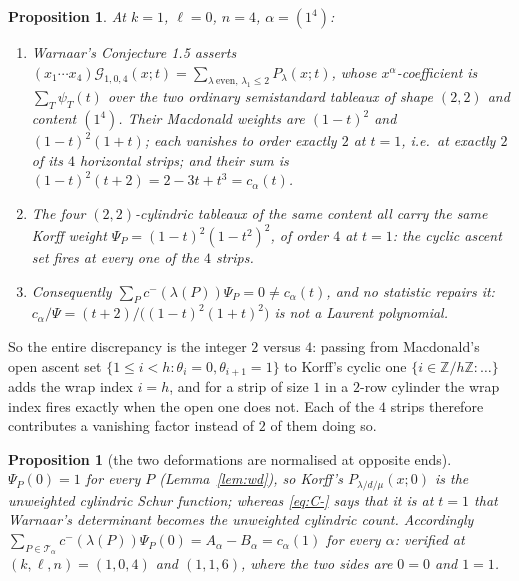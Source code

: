 \documentclass[11pt]{article}
\newtheorem{proposition}[theorem]{Proposition}
\theoremstyle{definition}
\newcommand{\la}{\lambda}
\newcommand{\Z}{\mathbb{Z}}
\newcommand{\T}{\mathcal{T}}
\begin{document}
\begin{proposition}\label{prop:located}
At $k=1$, $\ell=0$, $n=4$, $\alpha=(1^4)$:
\begin{enumerate}
\item Warnaar's Conjecture 1.5 asserts
$(x_1\cdots x_4)\mathcal G_{1,0,4}(x;t)=\sum_{\la\ \mathrm{even},\,\la_1\le2}P_\la(x;t)$,
whose $x^{\alpha}$-coefficient is $\sum_{T}\psi_T(t)$ over the two ordinary
semistandard tableaux of shape $(2,2)$ and content $(1^4)$. Their Macdonald
weights are $(1-t)^{2}$ and $(1-t)^{2}(1+t)$; each vanishes to order exactly
$2$ at $t=1$, i.e.\ at exactly $2$ of its $4$ horizontal strips; and their sum
is $(1-t)^{2}(t+2)=2-3t+t^{3}=c_\alpha(t)$.
\item The four $(2,2)$-cylindric tableaux of the same content all carry the
\emph{same} Korff weight $\Psi_P=(1-t)^{2}(1-t^{2})^{2}$, of order $4$ at
$t=1$: the cyclic ascent set fires at \emph{every} one of the $4$ strips.
\item Consequently $\sum_P c^{-}(\la(P))\Psi_P=0\ne c_\alpha(t)$, and no
statistic repairs it: $c_\alpha/\Psi=(t+2)/\bigl((1-t)^{2}(1+t)^{2}\bigr)$ is
not a Laurent polynomial.
\end{enumerate}
\end{proposition}

So the entire discrepancy is the integer $2$ versus $4$: passing from
Macdonald's open ascent set $\{1\le i<h:\theta_i=0,\theta_{i+1}=1\}$ to Korff's
cyclic one $\{i\in\Z/h\Z:\dots\}$ adds the wrap index $i=h$, and for a strip of
size $1$ in a $2$-row cylinder the wrap index fires exactly when the open one
does not. Each of the $4$ strips therefore contributes a vanishing factor
instead of $2$ of them doing so.

\begin{proposition}[the two deformations are normalised at opposite ends]
\label{prop:ends}
$\Psi_P(0)=1$ for every $P$ \textup{(Lemma~\ref{lem:wd})}, so Korff's
$P_{\la/d/\mu}(x;0)$ is the unweighted cylindric Schur function; whereas
\eqref{eq:C-} says that it is at $t=1$ that Warnaar's determinant becomes the
unweighted cylindric count. Accordingly
$\sum_{P\in\T_\alpha}c^{-}(\la(P))\Psi_P(0)=A_\alpha-B_\alpha=c_\alpha(1)$ for
every $\alpha$: verified at $(k,\ell,n)=(1,0,4)$ and $(1,1,6)$, where the two
sides are $0=0$ and $1=1$.
\end{proposition}
\end{document}
